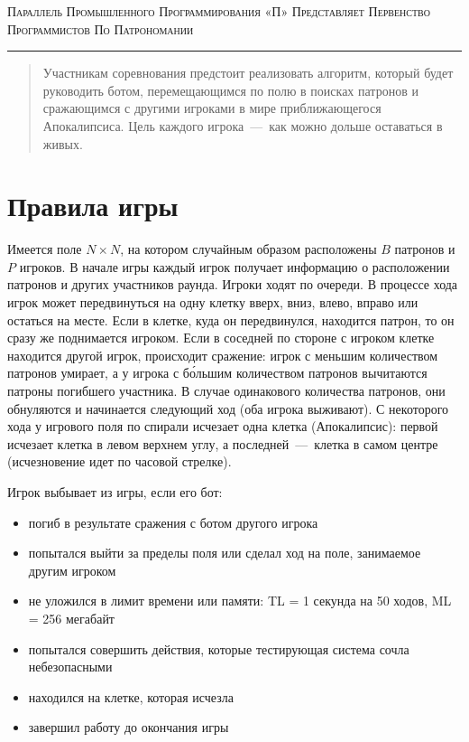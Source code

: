 \documentclass[a4paper,12pt]{article}
\begin{document}
\begin{center}
{\small\textsc{Параллель Промышленного Программирования «П» Представляет Первенство Программистов По Патрономании}}

\vskip 3pt \hrule \vskip 10pt

\end{center}
\begin{abstract}
Участникам соревнования предстоит реализовать алгоритм, который будет руководить ботом, перемещающимся по полю в поисках патронов и сражающимся с другими игроками в мире приближающегося Апокалипсиса. Цель каждого игрока~---~как можно дольше оставаться в живых.
\end{abstract}
\section{Правила игры}
Имеется поле $N\times N$, на котором случайным образом расположены $B$ патронов и $P$ игроков. В начале игры каждый игрок получает информацию о расположении патронов и других участников раунда. Игроки ходят по очереди. В процессе хода игрок может передвинуться на одну клетку вверх, вниз, влево, вправо или остаться на месте. Если в клетке, куда он передвинулся, находится патрон, то он сразу же поднимается игроком. Если в соседней по стороне с игроком клетке находится другой игрок, происходит сражение: игрок с меньшим количеством патронов умирает, а у игрока с б\'{о}льшим количеством патронов вычитаются патроны погибшего участника. В случае одинакового количества патронов, они обнуляются и начинается следующий ход (оба игрока выживают). С некоторого хода у игрового поля по спирали исчезает одна клетка (Апокалипсис): первой исчезает клетка в левом верхнем углу, а последней~---~клетка в самом центре (исчезновение идет по часовой стрелке).
\begin{flushleft}
Игрок выбывает из игры, если его бот:
\begin{itemize}
\item погиб в результате сражения с ботом другого игрока
\item попытался выйти за пределы поля или сделал ход на поле, занимаемое другим игроком
\item не уложился в лимит времени или памяти:
TL = 1 секунда на 50 ходов, ML = 256 мегабайт
\item попытался совершить действия, которые тестирующая система сочла небезопасными
\item находился на клетке, которая исчезла
\item завершил работу до окончания игры
\end{itemize}
\end{flushleft}
\end{document}
